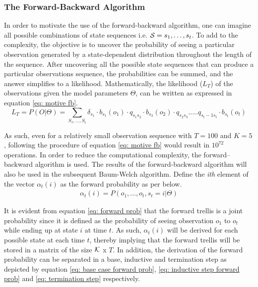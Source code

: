 \subsubsection{The Forward-Backward Algorithm}
\label{Section: Forward backward}
In order to motivate the use of the forward-backward algorithm, one can imagine all possible combinations of state sequences i.e. $\S = s_1,\ldots,s_t$. To add to the complexity, the objective is to uncover the probability of seeing a particular observation generated by a state-dependent distribution throughout the length of the sequence. After uncovering all the possible state sequences that can produce a particular observations sequence, the probabilities can be summed, and the answer simplifies to a likelihood. Mathematically, the likelihood ($L_T$) of the observations given the model parameters $\Theta$, can be written as expressed in equation \ref{eq: motive fb}.
\begin{equation}
    L_T = P(O|\Theta) = \sum_{S_1,\ldots,S_t} \delta_{s_1} \cdot  b_{s_1}(o_1) \cdot  q_{s_1s_2} \cdot  b_{s_2}(o_2) \cdot q_{s_2s_3} .....q_{s_t-1 s_t}\cdot b_{s_t}(o_t)
    \label{eq: motive fb}
\end{equation}

As such, even for a relatively small observation sequence with $T = 100$ and $K = 5$, following the procedure of equation \ref{eq: motive fb} would result in $10^{72}$ operations. In order to reduce the computational complexity, the forward–backward algorithm is used. The results of the forward-backward algorithm will also be used in the subsequent Baum-Welch algorithm. Define the \textit{ith} element of the vector $\alpha_t(i)$ as the forward probability as per below.
\begin{align}
    \alpha_t(i) = P(o_1,\ldots,o_t, s_t = i | \Theta)
    \label{eq: forward prob}
\end{align}

It is evident from equation \ref{eq: forward prob} that the forward trellis is a joint probability since it is defined as the probability of seeing observation $o_1 $ to $o_t$ while ending up at state $i$ at time $t$. As such, $\alpha_t(i)$ will be derived for each possible state at each time $t$, thereby implying that the forward trellis will be stored in a matrix of the size $\K$ x $T$. In addition, the derivation of the forward probability can be separated in a base, inductive and termination step as depicted by equation \ref{eq: base case forward prob}, \ref{eq: inductive step forward prob} and \ref{eq: termination step} respectively.

